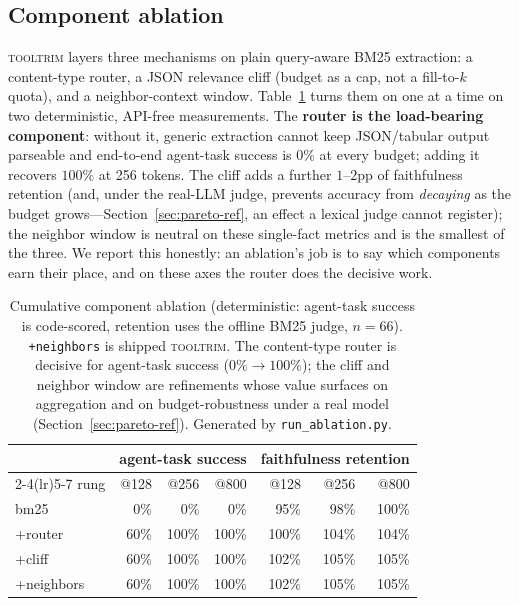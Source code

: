\documentclass[11pt]{article}
\newcommand{\tooltrim}{\textsc{tooltrim}}
\begin{document}
\subsection{Component ablation}
\label{sec:ablation}
\tooltrim{} layers three mechanisms on plain query-aware BM25 extraction: a
content-type router, a JSON relevance cliff (budget as a cap, not a fill-to-$k$
quota), and a neighbor-context window. Table~\ref{tab:ablation} turns them on one
at a time on two deterministic, API-free measurements. The \textbf{router is the
load-bearing component}: without it, generic extraction cannot keep JSON/tabular
output parseable and end-to-end agent-task success is $0\%$ at every budget;
adding it recovers $100\%$ at 256 tokens. The cliff adds a further $1$--$2$pp of
faithfulness retention (and, under the real-LLM judge, prevents accuracy from
\emph{decaying} as the budget grows---Section~\ref{sec:pareto-ref}, an effect a
lexical judge cannot register); the neighbor window is neutral on these
single-fact metrics and is the smallest of the three. We report this honestly: an
ablation's job is to say which components earn their place, and on these axes the
router does the decisive work.

\begin{table}[t]
\centering
\begin{tabular}{lrrrrrr}
\toprule
& \multicolumn{3}{c}{agent-task success} & \multicolumn{3}{c}{faithfulness retention} \\
\cmidrule(lr){2-4}\cmidrule(lr){5-7}
rung & @128 & @256 & @800 & @128 & @256 & @800 \\
\midrule
bm25             & 0\%  & 0\%   & 0\%   & 95\%  & 98\%  & 100\% \\
+router          & 60\% & 100\% & 100\% & 100\% & 104\% & 104\% \\
+cliff           & 60\% & 100\% & 100\% & 102\% & 105\% & 105\% \\
+neighbors       & 60\% & 100\% & 100\% & 102\% & 105\% & 105\% \\
\bottomrule
\end{tabular}
\caption{Cumulative component ablation (deterministic: agent-task success is
code-scored, retention uses the offline BM25 judge, $n{=}66$).
\texttt{+neighbors} is shipped \tooltrim{}. The content-type router is decisive
for agent-task success ($0\%\rightarrow100\%$); the cliff and neighbor window are
refinements whose value surfaces on aggregation and on budget-robustness under a
real model (Section~\ref{sec:pareto-ref}). Generated by \texttt{run\_ablation.py}.}
\label{tab:ablation}
\end{table}
\end{document}
